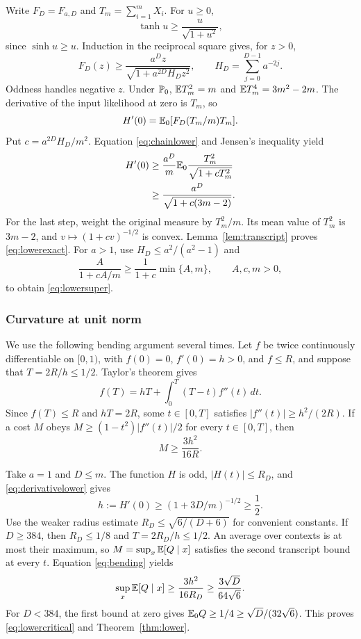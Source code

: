 Write \(F_D=F_{a,D}\) and \(T_m=\sum_{i=1}^mX_i\).
For \(u\ge0\),
\begin{equation}\label{eq:tanhlower}
\tanh u\ge\frac{u}{\sqrt{1+u^2}},
\end{equation}
since \(\sinh u\ge u\).
Induction in the reciprocal square gives, for \(z>0\),
\begin{equation}\label{eq:chainlower}
F_D(z)\ge\frac{a^Dz}{\sqrt{1+a^{2D}H_Dz^2}},
\qquad H_D=\sum_{j=0}^{D-1}a^{-2j}.
\end{equation}
Oddness handles negative \(z\).
Under \(\mathbb P_0\),
\(\mathbb E T_m^2=m\) and \(\mathbb E T_m^4=3m^2-2m\).
The derivative of the input likelihood at zero is \(T_m\), so
\[
H'(0)=\mathbb E_0[F_D(T_m/m)T_m].
\]
Put \(c=a^{2D}H_D/m^2\).
Equation \eqref{eq:chainlower} and Jensen's inequality yield
\begin{align}
H'(0)&\ge\frac{a^D}{m}
\mathbb E_0\frac{T_m^2}{\sqrt{1+cT_m^2}}
\notag\\
&\ge\frac{a^D}{\sqrt{1+c(3m-2)}}.
\label{eq:derivativelower}
\end{align}
For the last step, weight the original measure by \(T_m^2/m\).
Its mean value of \(T_m^2\) is \(3m-2\), and
\(v\mapsto(1+cv)^{-1/2}\) is convex.
Lemma~\ref{lem:transcript} proves \eqref{eq:lowerexact}.
For \(a>1\), use \(H_D\le a^2/(a^2-1)\) and
\[
\frac{A}{1+cA/m}\ge\frac1{1+c}\min\{A,m\},\qquad A,c,m>0,
\]
to obtain \eqref{eq:lowersuper}.

\subsubsection{Curvature at unit norm}

We use the following bending argument several times. Let \(f\) be
twice continuously differentiable on \([0,1)\), with \(f(0)=0\),
\(f'(0)=h>0\), and \(f\le R\), and suppose that
\(T=2R/h\le1/2\). Taylor's theorem gives
\[
f(T)=hT+\int_0^T(T-t)f''(t)\,dt.
\]
Since \(f(T)\le R\) and \(hT=2R\), some \(t\in[0,T]\)
satisfies \(|f''(t)|\ge h^2/(2R)\). If a cost \(M\) obeys
\(M\ge(1-t^2)|f''(t)|/2\) for every \(t\in[0,T]\), then
\begin{equation}\label{eq:bending}
M\ge\frac{3h^2}{16R}.
\end{equation}

Take \(a=1\) and \(D\le m\).
The function \(H\) is odd, \(|H(t)|\le R_D\), and
\eqref{eq:derivativelower} gives
\[
h:=H'(0)\ge(1+3D/m)^{-1/2}\ge\frac12.
\]
Use the weaker radius estimate
\(R_D\le\sqrt{6/(D+6)}\) for convenient constants.
If \(D\ge384\), then \(R_D\le1/8\) and \(T=2R_D/h\le1/2\).
An average over contexts is at most their maximum, so
\(M=\sup_x\mathbb E[Q\mid x]\) satisfies the second transcript bound at
every \(t\). Equation \eqref{eq:bending} yields
\[
\sup_x\mathbb E[Q\mid x]\ge\frac{3h^2}{16R_D}
\ge\frac{3\sqrt D}{64\sqrt6}.
\]
For \(D<384\), the first bound at zero gives
\(\mathbb E_0Q\ge1/4\ge\sqrt D/(32\sqrt6)\).
This proves \eqref{eq:lowercritical} and
Theorem~\ref{thm:lower}.

